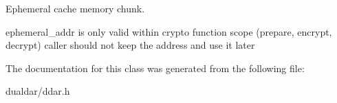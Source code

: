 \-Ephemeral cache memory chunk. 

ephemeral\-\_\-addr is only valid within crypto function scope (prepare, encrypt, decrypt) caller should not keep the address and use it later 

\-The documentation for this class was generated from the following file\-:\begin{DoxyCompactItemize}
\item 
dualdar/ddar.\-h\end{DoxyCompactItemize}
